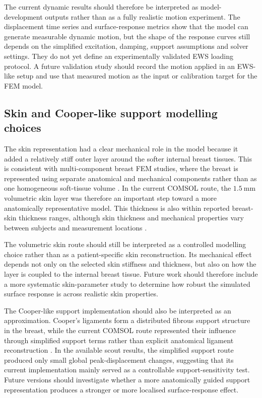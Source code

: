 The current dynamic results should therefore be interpreted as model-development outputs rather than as a fully realistic motion experiment. The displacement time series and surface-response metrics show that the model can generate measurable dynamic motion, but the shape of the response curves still depends on the simplified excitation, damping, support assumptions and solver settings. They do not yet define an experimentally validated EWS loading protocol. A future validation study should record the motion applied in an EWS-like setup and use that measured motion as the input or calibration target for the FEM model.


\subsection{Skin and Cooper-like support modelling choices}
\label{discussion_skin_cooper_support}

The skin representation had a clear mechanical role in the model because it added a relatively stiff outer layer around the softer internal breast tissues. This is consistent with multi-component breast FEM studies, where the breast is represented using separate anatomical and mechanical components rather than as one homogeneous soft-tissue volume \cite{Chen2025,Teixeira2023,Mazier2024}. In the current COMSOL route, the $1.5~\mathrm{mm}$ volumetric skin layer was therefore an important step toward a more anatomically representative model. This thickness is also within reported breast-skin thickness ranges, although skin thickness and mechanical properties vary between subjects and measurement locations \cite{Huang2008,Sutradhar2012}.

The volumetric skin route should still be interpreted as a controlled modelling choice rather than as a patient-specific skin reconstruction. Its mechanical effect depends not only on the selected skin stiffness and thickness, but also on how the layer is coupled to the internal breast tissue. Future work should therefore include a more systematic skin-parameter study to determine how robust the simulated surface response is across realistic skin properties.

The Cooper-like support implementation should also be interpreted as an approximation. Cooper's ligaments form a distributed fibrous support structure in the breast, while the current COMSOL route represented their influence through simplified support terms rather than explicit anatomical ligament reconstruction \cite{Chen2025}. In the available scout results, the simplified support route produced only small global peak-displacement changes, suggesting that its current implementation mainly served as a controllable support-sensitivity test. Future versions should investigate whether a more anatomically guided support representation produces a stronger or more localised surface-response effect.


